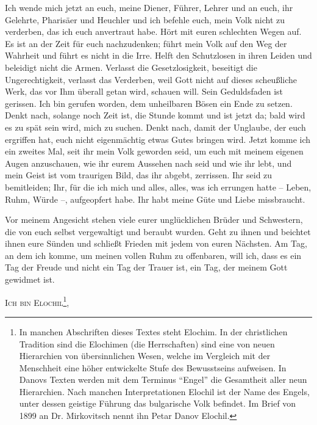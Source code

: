 Ich wende mich jetzt an euch, meine Diener, Führer, Lehrer und an euch, ihr Gelehrte, Pharisäer und Heuchler und ich befehle euch, mein Volk nicht zu verderben, das ich euch anvertraut habe. Hört mit euren schlechten Wegen auf. Es ist an der Zeit für euch nachzudenken; führt mein Volk auf den Weg der Wahrheit und führt es nicht in die Irre. Helft den Schutzlosen in ihren Leiden und beleidigt nicht die Armen. Verlasst die Gesetzlosigkeit, beseitigt die Ungerechtigkeit, verlasst das Verderben, weil Gott nicht auf dieses scheußliche Werk, das vor Ihm überall getan wird, schauen will. Sein Geduldsfaden ist gerissen. Ich bin gerufen worden, dem unheilbaren Bösen ein Ende zu setzen. Denkt nach, solange noch Zeit ist, die Stunde kommt und ist jetzt da; bald wird es zu spät sein wird, mich zu suchen. Denkt nach, damit der Unglaube, der euch ergriffen hat, euch nicht eigenmächtig etwas Gutes bringen wird. Jetzt komme ich ein zweites Mal, seit ihr mein Volk geworden seid, um euch mit meinem eigenen Augen anzuschauen, wie ihr eurem Aussehen nach seid und wie ihr lebt, und mein Geist ist vom traurigen Bild, das ihr abgebt, zerrissen. Ihr seid zu bemitleiden; Ihr, für die ich mich und alles, alles, was ich errungen hatte -- Leben, Ruhm, Würde --, aufgeopfert habe. Ihr habt meine Güte und Liebe missbraucht. 

Vor meinem Angesicht stehen viele eurer unglücklichen Brüder und Schwestern, die von euch selbst vergewaltigt und beraubt wurden. Geht zu ihnen und beichtet ihnen eure Sünden und schließt Frieden mit jedem von euren Nächsten. Am Tag, an dem ich komme, um meinen vollen Ruhm zu offenbaren, will ich, dass es ein Tag der Freude und nicht ein Tag der Trauer ist, ein Tag, der meinem Gott gewidmet ist. 

\vspace{0.5em}

\textsc{Ich bin Elochil\footnote{In manchen Abschriften dieses Textes steht Elochim. In der christlichen Tradition sind die Elochimen (die Herrschaften) sind eine von neuen Hierarchien von übersinnlichen Wesen, welche im Vergleich mit der Menschheit eine höher entwickelte Stufe des Bewusstseins aufweisen. In Danovs Texten werden mit dem Terminus "`Engel"' die Gesamtheit aller neun Hierarchien. Nach manchen Interpretationen Elochil ist der Name des Engels, unter dessen geistige Führung das bulgarische Volk befindet. Im Brief von 1899 an Dr. Mirkovitsch nennt ihn Petar Danov Elochil. },} 

\vspace{0.5em}

